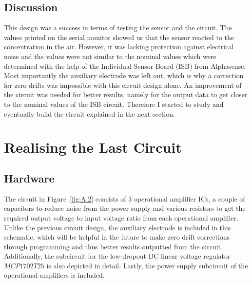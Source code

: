 \subsection{Discussion}
This design was a success in terms of testing the sensor and the circuit. The values printed on the serial monitor showed us that the sensor reacted to the  concentration in the air. However, it was lacking protection against electrical noise and the values were not similar to the nominal values which were determined with the help of the Individual Sensor Board (ISB) from Alphasense. Most importantly the auxiliary electrode was left out, which is why a correction for zero drifts was impossible with this circuit design alone. An improvement of the circuit was needed for better results, namely for the output data to get closer to the nominal values of the ISB circuit. Therefore I started to study and eventually build the circuit explained in the next section.  


\section{Realising the Last Circuit}
\subsection{Hardware}
The circuit in Figure~\ref{fig:A.2} consists of 3 operational amplifier ICs, a couple of capacitors to reduce noise from the power supply and various resistors to get the required output voltage to input voltage ratio from each operational amplifier. Unlike the previous circuit design, the auxiliary electrode is included in this schematic, which will be helpful in the future to make zero drift corrections through programming and thus better results outputted from the circuit. Additionally, the subcircuit for the low-dropout DC linear voltage regulator $MCP1702T25$ is also depicted in detail. Lastly, the power supply subcircuit of the operational amplifiers is included.

